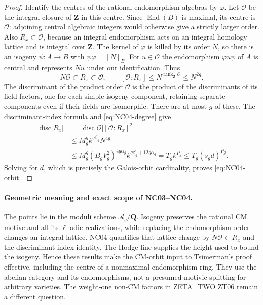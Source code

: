 \begin{proof}
Identify the centres of the rational endomorphism algebras by
$\varphi$.  Let $\mathcal O$ be the integral closure of $\mathbf Z$
in this centre.  Since $\operatorname{End}(B)$ is maximal,
its centre is $\mathcal O$: adjoining central algebraic integers
would otherwise give a strictly larger order.  Also
$R_x\subset\mathcal O$, because an integral endomorphism acts on
an integral homology lattice and is integral over $\mathbf Z$.
The kernel of $\varphi$ is killed by its order $N$, so there is an
isogeny $\psi:A\to B$ with $\psi\varphi=[N]_B$.
For $u\in\mathcal O$ the endomorphism
$\varphi u\psi$ of $A$ is central and represents $Nu$ under our
identification.  Thus
\[
 N\mathcal O\subset R_x\subset\mathcal O,
 \qquad [\mathcal O:R_x]\leq N^{\operatorname{rank}_{\mathbf Z}\mathcal O}
                         \leq N^{2g}.
\]
The discriminant of the product order $\mathcal O$ is the product
of the discriminants of its field factors, one for each simple
isogeny component, retaining separate components even if their
fields are isomorphic.  There are at most $g$ of these.  The discriminant-index formula
and \eqref{eq:NC04-degree} give
\begin{align*}
 |\operatorname{disc}R_x|
 &=|\operatorname{disc}\mathcal O|[\mathcal O:R_x]^2\\
 &\leq M_g^gk^{g\beta_g}N^{4g}\\
 &\leq M_g^g(B_gV_g^2)^{4g\alpha_g}
             k^{g\beta_g+12g\alpha_g}
   =T_gk^{P_g}\leq T_g(s_gd)^{P_g}.
\end{align*}
Solving for $d$, which is precisely the Galois-orbit cardinality,
proves \eqref{eq:NC04-orbit}.
\end{proof}

\paragraph{Geometric meaning and exact scope of NC03--NC04.}
The points lie in the moduli scheme $\mathcal A_g/\mathbf Q$.
Isogeny preserves the rational CM motive and all its $\ell$-adic
realizations, while replacing the endomorphism order changes an integral
lattice.  NC04 quantifies that lattice change by
$N\mathcal O\subset R_x$ and the discriminant-index identity.
The Hodge line supplies the height used to bound the isogeny.
Hence these results make the CM-orbit input to Tsimerman's proof
effective, including the centre of a nonmaximal endomorphism ring.
They use the abelian category and its endomorphisms, not a presumed
motivic splitting for arbitrary varieties.  The weight-one non-CM
factors in ZETA\_TWO ZT06 remain a different question.

